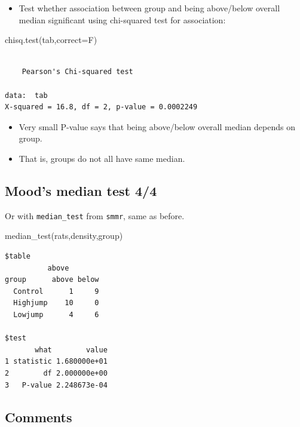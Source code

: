 \documentclass[
  letterpaper,
  DIV=11,
  numbers=noendperiod]{scrartcl}
\newenvironment{Shaded}{\begin{snugshade}}{\end{snugshade}}
\newcommand{\AttributeTok}[1]{\textcolor[rgb]{0.40,0.45,0.13}{#1}}
\newcommand{\FunctionTok}[1]{\textcolor[rgb]{0.28,0.35,0.67}{#1}}
\newcommand{\NormalTok}[1]{\textcolor[rgb]{0.00,0.23,0.31}{#1}}
\providecommand{\tightlist}{%
  \setlength{\itemsep}{0pt}\setlength{\parskip}{0pt}}\usepackage{longtable,booktabs,array}
\begin{document}
\begin{itemize}
\tightlist
\item
  Test whether association between group and being above/below overall
  median significant using chi-squared test for association:
\end{itemize}

\begin{Shaded}
\begin{Highlighting}[]
\FunctionTok{chisq.test}\NormalTok{(tab,}\AttributeTok{correct=}\NormalTok{F)}
\end{Highlighting}
\end{Shaded}

\begin{verbatim}

    Pearson's Chi-squared test

data:  tab
X-squared = 16.8, df = 2, p-value = 0.0002249
\end{verbatim}

\begin{itemize}
\tightlist
\item
  Very small P-value says that being above/below overall median depends
  on group.
\item
  That is, groups do not all have same median.
\end{itemize}

\hypertarget{moods-median-test-44}{%
\subsection{Mood's median test 4/4}\label{moods-median-test-44}}

Or with \texttt{median\_test} from \texttt{smmr}, same as before.

\begin{Shaded}
\begin{Highlighting}[]
\FunctionTok{median\_test}\NormalTok{(rats,density,group)}
\end{Highlighting}
\end{Shaded}

\begin{verbatim}
$table
          above
group      above below
  Control      1     9
  Highjump    10     0
  Lowjump      4     6

$test
       what        value
1 statistic 1.680000e+01
2        df 2.000000e+00
3   P-value 2.248673e-04
\end{verbatim}

\hypertarget{comments}{%
\subsection{Comments}\label{comments}}
\end{document}
